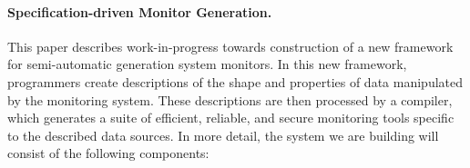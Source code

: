 \documentclass{sigplanconf}
\begin{document}


\paragraph*{Specification-driven Monitor Generation.}
This paper describes work-in-progress towards construction
of a new framework for semi-automatic generation system monitors. 
In this new framework, programmers create descriptions of
the shape and properties of data manipulated by
the monitoring system.  These descriptions are then processed by
a compiler, which generates a suite of efficient, reliable, and secure
monitoring tools specific to the described data sources.
In more detail, the system we are building will consist of the 
following components:
\end{document}
